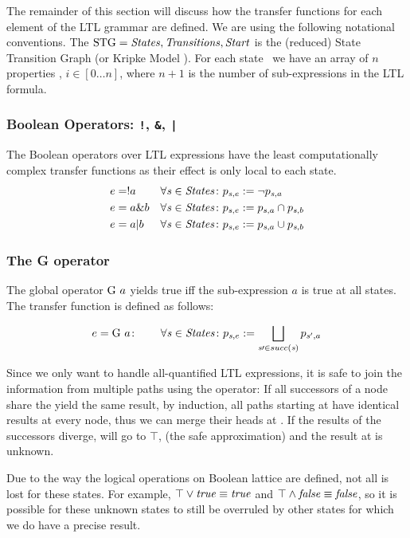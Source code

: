 The remainder of this section will discuss how the transfer functions
for each element of the LTL grammar are defined. We are using the
following notational conventions. The
$\mathrm{STG}={\mathit{States},\mathit{Transitions},\mathit{Start}}$ is the
(reduced) State Transition Graph (or Kripke Model
\citep[pg. 27ff]{Clarke1999}). For each state \state\ we have an array of $n$
properties , $i \in [0\dots n]$, where $n+1$ is the number of
sub-expressions in the LTL formula.

\subsubsection{Boolean Operators: \texttt{!}, \texttt{\&}, \texttt{|}}
The Boolean operators over LTL expressions have the least
computationally complex transfer functions as their effect is only
local to each state.
\begin{align*}
e &= !a  & \forall\mathit{s}\in\mathit{States}\colon p_{\mathit{s},e} &:= \neg p_{\mathit{s},a}\\
e &= a \& b & \forall\mathit{s}\in\mathit{States}\colon p_{\mathit{s},e} &:= p_{\mathit{s},a} \cap p_{\mathit{s},b}\\
e &= a | b & \forall\mathit{s}\in\mathit{States}\colon p_{\mathit{s},e} &:= p_{\mathit{s},a} \cup p_{\mathit{s},b}\\
\end{align*}

\subsubsection{The G operator}
The global operator $\mathrm{G}\  a$ yields true iff the sub-expression $a$ is
true at all states. The transfer function is defined as follows:

\[ e = \mathrm{G}\  a\colon\qquad\forall\mathit{s}\in\mathit{States}\colon p_{\mathit{s},e}
:=\bigsqcup_{\mathit{s}\prime\in succ(\mathit{s})}{p_{\mathit{s}',a}} \]

Since we only want to handle all-quantified LTL expressions, it is
safe to join the information from multiple paths using the \lub
operator: If all successors of a node share the yield the same result,
by induction, all paths starting at \state have identical results at
every node, thus we can merge their heads at \state. If the results of
the successors diverge, \state will go to $\top$, (the safe
approximation) and the result at \state is unknown.

Due to the way the logical operations on Boolean lattice are defined,
not all is lost for these states. For example, $\top \vee \mathit{true}
\equiv \mathit{true}$ and $\top \wedge \mathit{false} \equiv \mathit{false}$, so it is
possible for these unknown states to still be overruled by other
states for which we do have a precise result.

